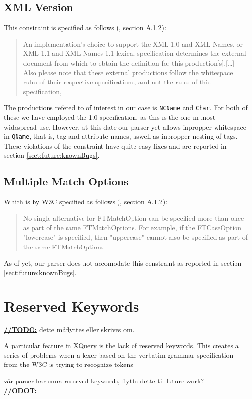 \subsection{XML Version}
This constraint is specified as follows (\cite{w3c00}, section A.1.2):
\begin{quote}
An implementation's choice to support the XML 1.0 and XML Names, or XML 1.1 and XML Names 1.1 lexical specification determines the external document from which to obtain the definition for this production[s].[\ldots] Also please note that these external productions follow the whitespace rules of their respective specifications, and not the rules of this specification,
\end{quote}

The productions refered to of interest in our case is \verb!NCName! and \verb!Char!. For both of these we have employed the 1.0 specification, as this is the one in most widespread use. However, at this date our parser yet allows inpropper whitespace in \verb!QName!, that is, tag and attribute names, aswell as inpropper nesting of tags. These violations of the constraint have quite easy fixes and are reported in section \ref{sect:future:knownBugs}.

\subsection{Multiple Match Options}
Which is by W3C specified as follows (\cite{w3c00}, section A.1.2):
\begin{quote}
No single alternative for FTMatchOption can be specified more than once as part of the same FTMatchOptions. For example, if the FTCaseOption "lowercase" is specified, then "uppercase" cannot also be specified as part of the same FTMatchOptions.
\end{quote}

As of yet, our parser does not accomodate this constraint as reported in section \ref{sect:future:knownBugs}.

\section{Reserved Keywords}

\underline{\textbf{\LARGE //TODO:}} dette m\aa flyttes eller skrives om.

A particular feature in XQuery is the lack of reserved keywords. This creates a
series of problems when a lexer based on the verbatim grammar specification from
the W3C is trying to recognize tokens. 

v\aa r parser har enna reserved keywords, flytte dette til future work? \\
\underline{\textbf{\LARGE //ODOT:}} 



